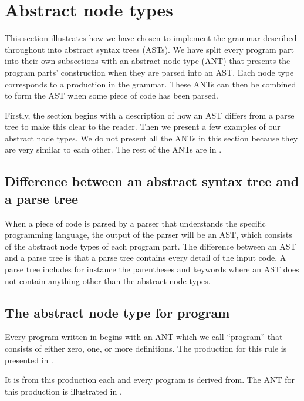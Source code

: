 \section{Abstract node types}
\label{sec:ant}

This section illustrates how we have chosen to implement the grammar described
throughout  into abstract syntax trees (ASTs). 
We have split every program part into their own subsections with an abstract
node type (ANT) that presents the program parts' construction when they are parsed into an
AST. Each node type corresponds to a production in the grammar. These ANTs can
then be combined to form the AST when some piece of code has been parsed.

Firstly, the section begins with a description of how an AST differs from a parse tree 
to make this clear to the reader. Then we present a few examples of our abstract
node types. We do not present all the ANTs in this section because they are very
similar to each other. The rest of the ANTs are in .

\subsection{Difference between an abstract syntax tree and a parse tree}
When a piece of code is parsed by a parser that understands the specific programming 
language, the output of the parser will be an AST, which consists of the abstract node 
types of each program part. The difference between an AST and a parse tree is that a 
parse tree contains every detail of the input code. A parse tree includes for instance
the parentheses and keywords where an AST does not contain anything other than the 
abstract node types\cite{parsevsast}.

\subsection{The abstract node type for program}
Every program written in \productname{} begins with an ANT which 
we call ``program'' that consists of either zero, one, or more definitions. The 
production for this rule is presented in .


It is from this production each and every program is derived from. The ANT for 
this production is illustrated in .

